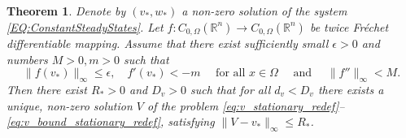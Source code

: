 \documentclass[11pt, a4paper]{article}
\theoremstyle{break}
\newtheorem{thm}{Theorem}[section]
\theoremstyle{break}
\theoremstyle{break}
\theoremstyle{break}
\theoremstyle{break}
\theoremstyle{break}
\theoremstyle{break}
\theoremstyle{break}
\theoremstyle{break}
\theoremstyle{break}
\begin{document}
\begin{thm}
    \label{thm:Stationary-Solutions-Existence}
    Denote by $(v_*, w_*)$ a non-zero solution of the system \eqref{EQ:ConstantSteadyStates}. Let $f : C_{0, \Omega}(\mathbb{R}^n) \rightarrow C_{0, \Omega}(\mathbb{R}^n)$ be twice Fr\'echet differentiable mapping. Assume that there exist sufficiently small $\epsilon > 0$ and numbers $M > 0, m > 0$ such that
    \begin{equation}
        \label{eq:nonlinearity_f_assumptions}
        \|f(v_*)\|_\infty \leq \epsilon, 
        \quad
        f'(v_*) < -m
        \quad
        \text{ for all }
        x \in \Omega
        \quad
        \text{ and }
        \quad
        \|f''\|_\infty < M.
    \end{equation}
    Then there exist $R_* > 0$ and $D_v > 0$ such that for all $d_v < D_v$ there exists a unique, non-zero solution $V$ of the problem \eqref{eq:v_stationary_redef}--\eqref{eq:v_bound_stationary_redef}, satisfying $\|V-v_*\|_\infty \leq R_*$.
\end{thm}
\end{document}
